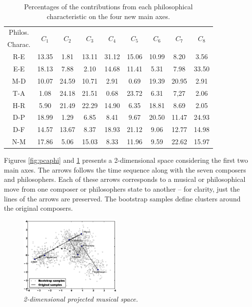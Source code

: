 \documentclass[
 aip,
 jmp,
 amsmath,amssymb,
 reprint,
]{revtex4-1}
\begin{document}
\begin{table}%
\caption{\label{tab:Deviatesphi}Percentages of
the contributions from each philosophical characteristic on the four new main axes.  }
\begin{tabular}{|c||c|c|c|c|c|c|c|c|}
\hline
Philos. & \multirow{2}{*}{$C_1$} & \multirow{2}{*}{$C_2$} & \multirow{2}{*}{$C_3$} & \multirow{2}{*}{$C_4$} & \multirow{2}{*}{$C_5$} & \multirow{2}{*}{$C_6$} & \multirow{2}{*}{$C_7$} & \multirow{2}{*}{$C_8$}\\
Charac. & & & & & & & & \\
\hline
R-E & 13.35   &  1.81 & 13.11 & 31.12 & 15.06 & 10.99 &  8.20 &  3.56 \\
E-E & 18.13   &  7.88 &  2.10 & 14.68 & 11.41 &  5.31 &  7.98 & 33.50 \\
M-D & 10.07   & 24.59 & 10.71 &  2.91 &  0.69 & 19.39 & 20.95 &  2.91 \\
T-A &  1.08   & 24.18 & 21.51 &  0.68 & 23.72 &  6.31 &  7,27 &  2.06 \\
H-R &  5.90   & 21.49 & 22.29 & 14.90 &  6.35 & 18.81 &  8.69 &  2.05 \\
D-P & 18.99   &  1.29 &  6.85 &  8.41 &  9.67 & 20.50 & 11.47 & 24.93 \\
D-F & 14.57   & 13.67 &  8.37 & 18.93 & 21.12 &  9.06 & 12.77 & 14.98 \\
N-M & 17.86   &  5.06 & 15.03 &  8.33 & 11.96 &  9.59 & 22.62 & 15.97 \\
\hline

\end{tabular}
\end{table}

Figures \ref{fig:pcaphi} and \ref{fig:pcamus} presents a 2-dimensional space considering the first two main axes. The arrows follows the time sequence along with the seven composers and philosophers. Each of these arrows corresponds to a musical or philosophical move from one composer or philosophers state to another -- for clarity, just the lines of the arrows are preserved. 
The bootstrap samples define clusters around the original composers.

\begin{figure}[htbp]
  \begin{center}
    \includegraphics[width=0.45\textwidth]{g1}
  \end{center}
  \caption{\it 2-dimensional projected musical space.}
  \label{fig:pcamus}
\end{figure}
\end{document}
